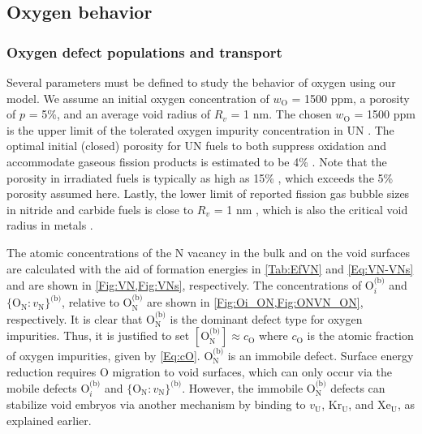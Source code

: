 \documentclass[preprint,12pt,sort&compress]{elsarticle}
\newcommand{\?}{\stackrel{?}{=}}
\providecommand{\DIFaddtex}[1]{{\bf #1}} %
\providecommand{\DIFaddbegin}{\protect\color{blue}} %
\providecommand{\DIFaddend}{\protect\color{black}} %
\providecommand{\DIFadd}[1]{\texorpdfstring{\DIFaddtex{#1}}{#1}} %
\begin{document}
\subsection{Oxygen behavior}
\label{Sec:Oxygen}

\DIFaddbegin \subsubsection{\DIFadd{Oxygen defect populations and transport}}

\DIFaddend Several parameters must be defined to study the behavior of oxygen using our model. We assume an initial oxygen concentration of $w_\text{O}$ = 1500 ppm, a porosity of $p$ = 5\%, and an average void radius of $R_v$ = 1 nm. The chosen $w_\text{O}$ = 1500 ppm is the upper limit of the tolerated oxygen impurity concentration in UN \cite{Rogozkin2003, Schuler2017}. The optimal initial (closed) porosity for UN fuels to both suppress oxidation and accommodate gaseous fission products is estimated to be 4\% \cite{Johnson2018}. Note that the porosity in irradiated fuels is typically as high as 15\% \cite{Nichenko2014}, which exceeds the 5\% porosity assumed here. Lastly, the lower limit of reported fission gas bubble sizes in nitride and carbide fuels is close to $R_v$ = 1 nm \cite{Matzke1986}, which is also the critical void radius in metals \cite{Zinkle1987b}.

The atomic concentrations of the N vacancy in the bulk and on the void surfaces are calculated with the aid of formation energies in \cref{Tab:EfVN} and \cref{Eq:VN-VNs} and are shown in \cref{Fig:VN,Fig:VNs}, respectively. The concentrations of $\text{O}_i^\text{(b)}$ and $\{\text{O}_\text{N} \! : \! v_\text{N}\}^\text{(b)}$, relative to $\text{O}_\text{N}^\text{(b)}$ are shown in \cref{Fig:Oi_ON,Fig:ONVN_ON}, respectively. It is clear that $\text{O}_\text{N}^\text{(b)}$ is the dominant defect type for oxygen impurities. Thus, it is justified to set $[ \text{O}_\text{N}^\text{(b)} ] \approx c_\text{O}$ where $c_\text{O}$ is the atomic fraction of oxygen impurities, given by \cref{Eq:cO}. $\text{O}_\text{N}^\text{(b)}$ is an immobile defect. Surface energy reduction requires O migration to void surfaces, which can only occur via the mobile defects $\text{O}_i^\text{(b)}$ and $\{\text{O}_\text{N} \! : \! v_\text{N}\}^\text{(b)}$. However, the immobile $\text{O}_\text{N}^\text{(b)}$ defects can stabilize void embryos via another mechanism by binding to $v_\text{U}$, $\text{Kr}_\text{U}$, and $\text{Xe}_\text{U}$, as explained earlier.
\end{document}
